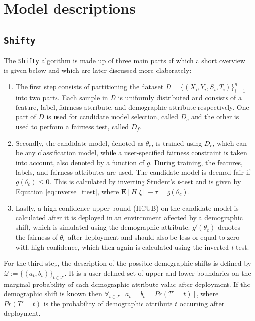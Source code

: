 \section{Model descriptions}
\label{sec:model_desc}

\subsection{\texttt{Shifty}}
The \texttt{Shifty} algorithm is made up of three main parts of which a short overview is given below and which are later discussed more elaborately:
\begin{enumerate}
    \item The first step consists of partitioning the dataset $D = \{(X_i,Y_i,S_i,T_i)\}^n_{i=1}$ into two parts. Each sample in $D$ is uniformly distributed and consists of a feature, label, fairness attribute, and demographic attribute respectively. One part of $D$ is used for candidate model selection, called $D_c$ and the other is used to perform a fairness test, called $D_f$. 

    \item Secondly, the candidate model, denoted as $\theta_c$, is trained using $D_c$, which can be any classification model, while a user-specified fairness constraint is taken into account, also denoted by a function of $g$. During training, the features, labels, and fairness attributes are used. The candidate model is deemed fair if $g(\theta_c) \leq 0$. This is calculated by inverting Student's \textit{t}-test \cite{student} and is given by Equation \ref{eq:inverse_ttest}, where $\mathbf{E}[H|\xi]-\tau= g(\theta_c)$.

    \item Lastly, a high-confidence upper bound (HCUB) on the candidate model is calculated after it is deployed in an environment affected by a demographic shift, which is simulated using the demographic attribute. $g'(\theta_c)$ denotes the fairness of $\theta_c$ after deployment and should also be less or equal to zero with high confidence, which then again is calculated using the inverted \textit{t}-test.
    
\end{enumerate}

For the third step, the description of the possible demographic shifts is defined by $\mathcal{Q}:=\{ (a_t,b_t) \}_{t\in\mathcal{T}}$. It is a user-defined set of upper and lower boundaries on the marginal probability of each demographic attribute value after deployment. If the demographic shift is known then $\forall_{t\in\mathcal{T}}[a_t = b_t = Pr(T'=t)]$, where $Pr(T'=t)$ is the probability of demographic attribute $t$ occurring after deployment. 

